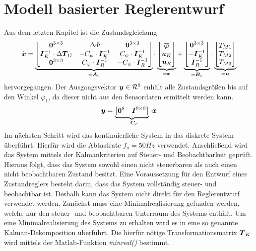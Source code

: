 \section{Modell basierter Reglerentwurf}
Aus dem letzten Kapitel ist die Zustandsgleichung
\begin{equation}
\dot{\boldsymbol{x}} = \underbrace{\begin{bmatrix}
\boldsymbol{0}^{3\times 3} & \Delta\varPhi & \boldsymbol{0}^{3\times 3} 
\\
\boldsymbol{I}_K^{-1}\cdot\Delta\boldsymbol{T}_G & -C_{\psi}\cdot\boldsymbol{I}^{-1}_K & C_{\psi}\cdot\boldsymbol{I}^{-1}_K
\\
\boldsymbol{0}^{3\times 3} & C_{\psi}\cdot\boldsymbol{I}^{-1}_R & -C_{\psi}\cdot\boldsymbol{I}^{-1}_R
\end{bmatrix}}_{=\boldsymbol{A}_c} \cdot \underbrace{\begin{bmatrix}
\boldsymbol{\overline{\varphi}} 
\\
\boldsymbol{u}_K \\
\boldsymbol{u}_R
\end{bmatrix}}_{=\boldsymbol{x}}
+
\underbrace{\begin{bmatrix}
\boldsymbol{0}^{3\times 3}
\\
-\boldsymbol{I}^{-1}_K
\\
\boldsymbol{I}^{-1}_R
\end{bmatrix}}_{=\boldsymbol{B}_c}\cdot \underbrace{\begin{bmatrix}
T_{M1} \\ T_{M2} \\ T_{M3}
\end{bmatrix}}_{=\boldsymbol{u}}
\end{equation}
hervorgegangen. Der Ausgangsvektor $\boldsymbol{y}\in \mathcal{R}^8$ enhält alle Zustandsgrößen bis auf den Winkel $\varphi_1$, da dieser nicht aus den Sensordaten ermittelt werden kann.
\begin{equation}
\boldsymbol{y} = \underbrace{\begin{bmatrix}
\boldsymbol{0}^8 & \boldsymbol{I}^{8\times 8}
\end{bmatrix}}_{\equiv \boldsymbol{C}_c} \cdot \boldsymbol{x}
\end{equation}
Im nächsten Schritt wird das kontinuierliche System  in das diskrete System  überführt. Hierfür wird die Abtastrate $f_a = 50Hz$ verwendet.
Anschließend wird das System mittels der Kalmankriterien auf Steuer- und Beobachtbarkeit geprüft. Hieraus folgt, dass das System sowohl einen nicht steuerbaren als auch einen nicht beobachtbaren Zustand besitzt. Eine Voraussetzung für den Entwurf eines Zustandreglers besteht darin, dass das System vollständig steuer- und beobachtbar ist. Deshalb kann das System  nicht direkt für den Reglerentwurf verwendet werden. Zunächst muss eine Minimalrealisierung  gefunden werden, welche nur den steuer- und beobachtbaren Unterraum des Systems enthält. Um eine Minimalrealisierung des Systems zu erhalten wird es in eine so genannte Kalman-Dekomposition  überführt. Die hierfür nötige Transformationsmatrix $\boldsymbol{T}_K$ wird mittels der Matlab-Funktion \textit{minreal()} bestimmt.

